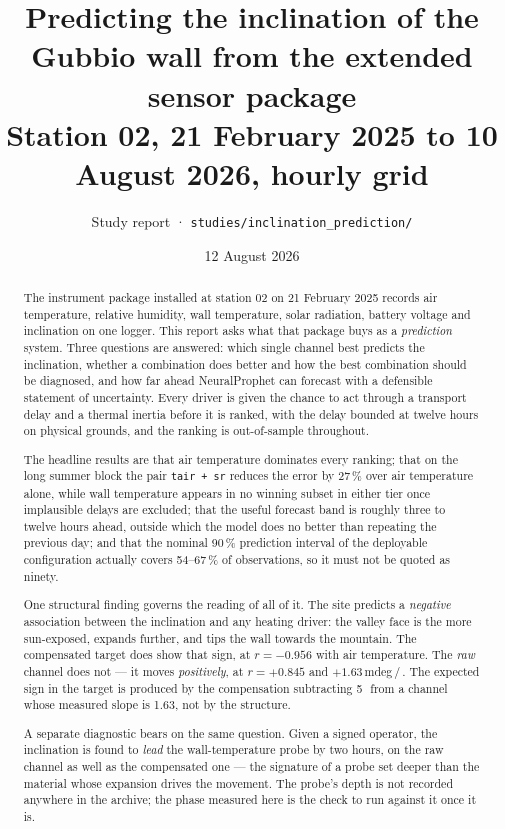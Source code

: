 \documentclass[11pt,a4paper]{article}
\title{\vspace{-1.2cm}\textbf{Predicting the inclination of the Gubbio wall
from the extended sensor package}\\[2mm]
\large Station 02, 21 February 2025 to 10 August 2026, hourly grid}
\author{Study report · \texttt{studies/inclination\_prediction/}}
\date{12 August 2026}
\begin{document}
\maketitle
\thispagestyle{fancy}

\begin{abstract}
\noindent
The instrument package installed at station 02 on 21 February 2025 records air
temperature, relative humidity, wall temperature, solar radiation, battery
voltage and inclination on one logger. This report asks what that package buys
as a \emph{prediction} system. Three questions are answered: which single channel
best predicts the inclination, whether a combination does better and how the best
combination should be diagnosed, and how far ahead NeuralProphet can forecast
with a defensible statement of uncertainty. Every driver is given the chance to
act through a transport delay and a thermal inertia before it is ranked, with the
delay bounded at twelve hours on physical grounds, and the ranking is
out-of-sample throughout.

The headline results are that air temperature dominates every ranking; that on
the long summer block the pair \texttt{tair + sr} reduces the error by 27\,\%
over air temperature alone, while wall temperature appears in no winning subset
in either tier once implausible delays are excluded; that the useful forecast
band is roughly three to twelve hours ahead, outside which the model does no
better than repeating the previous day; and that the nominal 90\,\% prediction
interval of the deployable configuration actually covers 54--67\,\% of
observations, so it must not be quoted as ninety.

One structural finding governs the reading of all of it. The site predicts a
\emph{negative} association between the inclination and any heating driver: the
valley face is the more sun-exposed, expands further, and tips the wall towards
the mountain. The compensated target does show that sign, at $r = -0.956$ with
air temperature. The \emph{raw} channel does not --- it moves \emph{positively},
at $r = +0.845$ and $+1.63$\,mdeg\,/\,\degC. The expected sign in the target is
produced by the compensation subtracting 5\,\mdegC\ from a channel whose measured
slope is 1.63, not by the structure.

A separate diagnostic bears on the same question. Given a signed operator, the
inclination is found to \emph{lead} the wall-temperature probe by two hours, on
the raw channel as well as the compensated one --- the signature of a probe set
deeper than the material whose expansion drives the movement. The probe's depth
is not recorded anywhere in the archive; the phase measured here is the check to
run against it once it is.
\end{abstract}
\end{document}
